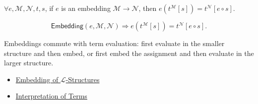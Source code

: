 \begin{remark*}
$\forall e,\mathcal{M},\mathcal{N},t,s$, if $e$ is an embedding
$\mathcal{M}\to\mathcal{N}$, then
$e(t^{\mathcal{M}}[s])=t^{\mathcal{N}}[e\circ s]$.
\end{remark*}

\begin{remark*}
\[
\mathsf{Embedding}(e,\mathcal{M},\mathcal{N})
\Longrightarrow
e(t^{\mathcal{M}}[s])=t^{\mathcal{N}}[e\circ s].
\]
\end{remark*}

\begin{remark*}[Interpretation]
Embeddings commute with term evaluation: first evaluate in the smaller
structure and then embed, or first embed the assignment and then evaluate in
the larger structure.
\end{remark*}

\begin{dependencies}
\begin{itemize}
  \item \hyperref[def:l-structure-embedding]{Embedding of $\mathcal{L}$-Structures}
  \item \hyperref[def:term-interpretation]{Interpretation of Terms}
\end{itemize}
\end{dependencies}
